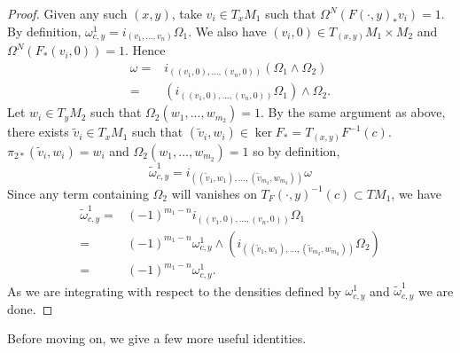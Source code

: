 \begin{proof}
Given any such $(x,y)$, take $v_i\in T_xM_1$ such that $\Omega^N(F(\cdot,y)_*v_i)=1$.  By definition, $\omega_{c,y}^1=i_{(v_1,...,v_n)}\Omega_1$.  We also have $(v_i,0)\in T_{(x,y)}M_1\times M_2$ and $\Omega^N(F_*(v_i,0))=1$.  Hence 
\begin{align}
\omega=&i_{((v_1,0),...,(v_n,0))}(\Omega_1\wedge\Omega_2)\\
=&(i_{((v_1,0),...,(v_n,0))}\Omega_1)\wedge\Omega_2.
\end{align}
Let $w_i\in T_y M_2$ such that $\Omega_2(w_1,...,w_{m_2})=1$.  By the same argument as above, there exists $\tilde{v}_i\in T_xM_1$ such that $(\tilde{v}_i,w_i)\in \ker F_*=T_{(x,y)}F^{-1}(c)$.  $\pi_{2*}(\tilde{v}_i,w_i)=w_i$ and $\Omega_2(w_1,...,w_{m_2})=1$ so by definition,
\begin{equation}
\tilde{\omega}_{c,y}^1=i_{((\tilde{v}_1,w_1),...,(\tilde{v}_{m_2},w_{m_2}))}\omega
\end{equation}
Since any term containing $\Omega_2$ will vanishes on $T_F(\cdot,y)^{-1}(c)\subset T M_1$, we have  
\begin{align}
\tilde{\omega}_{c,y}^1=&(-1)^{m_1-n}i_{((v_1,0),...,(v_n,0))}\Omega_1\\
=&(-1)^{m_1-n}\omega_{c,y}^1\wedge\left(i_{((\tilde{v}_1,w_1),...,(\tilde{v}_{m_2},w_{m_2}))}\Omega_2\right)\\
=&(-1)^{m_1-n}\omega_{c,y}^1.
\end{align}
As we are integrating with respect to the densities defined by $\omega_{c,y}^1$ and $\tilde{\omega}_{c,y}^1$ we are done.  
\end{proof}

Before moving on, we give a few more useful identities.

